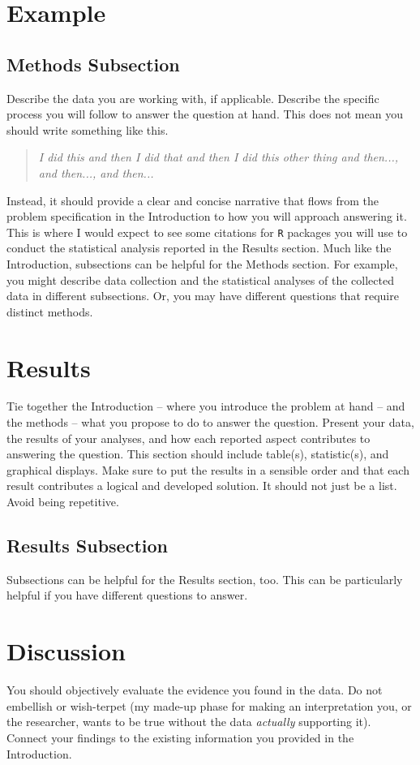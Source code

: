 \documentclass{article}\usepackage[]{graphicx}\usepackage[]{xcolor}
\begin{document}
\begin{multicols}{2}
\section{Example}\label{sec:examp}


\subsection{Methods Subsection}
Describe the data you are working with, if applicable. Describe the specific process you will follow to answer the question at hand. This does not mean you should write something like this.
\begin{quote}
\textit{I did this and then I did that and then I did this other thing and then..., and then..., and then...}
\end{quote}
Instead, it should provide a clear and concise narrative that flows from the problem specification in the Introduction to how you will approach answering it. This is where I would expect to see some citations for \texttt{R} packages you will use to conduct the statistical analysis reported in the Results section.
Much like the Introduction, subsections can be helpful for the Methods section. For example, you might describe data collection and the statistical analyses of the collected data in different subsections. Or, you may have different questions that require distinct methods. 

\section{Results}
Tie together the Introduction -- where you introduce the problem at hand -- and the methods --  what you propose to do to answer the question. Present your data, the results of your analyses, and how each reported aspect contributes to answering the question. This section should include table(s), statistic(s), and graphical displays. Make sure to put the results in a sensible order and that each result contributes a logical and developed solution. It should not just be a list. Avoid being repetitive. 

\subsection{Results Subsection}
Subsections can be helpful for the Results section, too. This can be particularly helpful if you have different questions to answer. 


\section{Discussion}
 You should objectively evaluate the evidence you found in the data. Do not embellish or wish-terpet (my made-up phase for making an interpretation you, or the researcher, wants to be true without the data \emph{actually} supporting it). Connect your findings to the existing information you provided in the Introduction.


\end{multicols}
\end{document}
